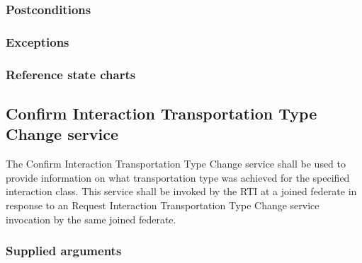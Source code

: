 \begin{compactstdpage}

    \subsubsection{Postconditions}



    \subsubsection{Exceptions}



    \subsubsection{Reference state charts}



    \subsection{Confirm Interaction Transportation Type Change \rtiinitiated{} service}


    The Confirm Interaction Transportation Type Change \rtiinitiated{} service shall be used to provide information on what transportation type was achieved for the specified interaction class. This service shall be invoked by the RTI at a joined federate in response to an Request Interaction Transportation Type Change service invocation by the same joined federate.

    \subsubsection{Supplied arguments}



\end{compactstdpage}
